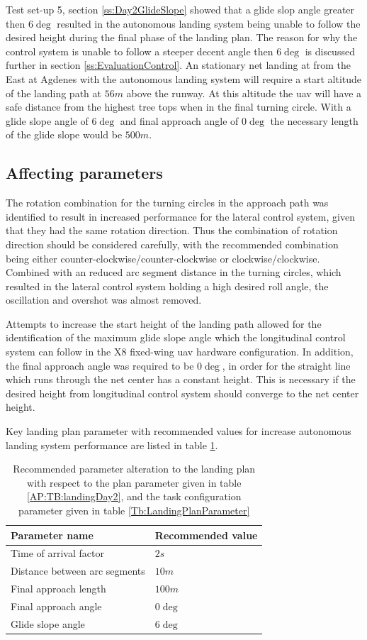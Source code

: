 Test set-up 5, section \ref{ss:Day2GlideSlope} showed that a glide slop angle greater then $6 \deg$ resulted in the autonomous landing system being unable to follow the desired height during the final phase of the landing plan. The reason for why the control system is unable to follow a steeper decent angle then $6 \deg$ is discussed further in section \ref{ss:EvaluationControl}. An stationary net landing at from the East at Agdenes with the autonomous landing system will require a start altitude of the landing path at $56 m$ above the runway. At this altitude the \gls{uav} will have a safe distance from the highest tree tops when in the final turning circle. With a glide slope angle of $6 \deg$ and final approach angle of $0 \deg$ the necessary length of the glide slope would be $500 m$.
\subsection{Affecting parameters}
The rotation combination for the turning circles in the approach path was identified to result in increased performance for the lateral control system, given that they had the same rotation direction. Thus the combination of rotation direction should be considered carefully, with the recommended combination being either counter-clockwise/counter-clockwise or clockwise/clockwise. Combined with an reduced arc segment distance in the turning circles, which resulted in the lateral control system holding a high desired roll angle, the oscillation and overshot was almost removed.

Attempts to increase the start height of the landing path allowed for the identification of the maximum glide slope angle which the longitudinal control system can follow in the X8 fixed-wing \gls{uav} hardware configuration. In addition, the final approach angle was required to be $0 \deg$, in order for the straight line which runs through the net center has a constant height. This is necessary if the desired height from longitudinal control system should converge to the net center height.

Key landing plan parameter with recommended values for increase autonomous landing system performance are listed in table \ref{Tb:RecommmendedLandingPlanParameter}.
\begin{table}[H]
\centering
\begin{tabular}{| l | l |}
\hline
\textbf{Parameter name}			&  \textbf{Recommended value} 	\\ \hline
Time of arrival factor			&	$2 s$						\\ \hline
Distance between arc segments	&	$10 m$					 	\\ \hline
Final approach length			&	$100 m$					 	\\ \hline
Final approach angle			&   $0 \deg$					\\ \hline
Glide slope angle				&	$6 \deg$				 	\\ \hline
\end{tabular}
\caption{Recommended parameter alteration to the landing plan with respect to the plan parameter given in table \ref{AP:TB:landingDay2}, and the task configuration parameter given in table \ref{Tb:LandingPlanParameter}}
\label{Tb:RecommmendedLandingPlanParameter}
\end{table}
